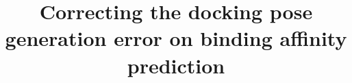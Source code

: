 \documentclass[twocolumn]{bmcart}
\begin{document}
\begin{frontmatter}

\begin{fmbox}


\title{Correcting the docking pose generation error on binding affinity prediction}


\author[
   addressref={aff1},                   %
   email={jackyleehongjian@gmail.com}   %
]{ }
\author[
   addressref={aff1},                   %
   email={ksleung@cse.cuhk.edu.hk}
]{ }
\author[
   addressref={aff1},                   %
   email={mhwong@cse.cuhk.edu.hk}
]{ }
\author[
   addressref={aff2,aff3,aff4,aff5},
   corref={aff2,aff3,aff4,aff5},                      %
   email={E-Mail: pedro.ballester@inserm.fr; Tel.: +33-486-977-265; Fax: +33-486-977-499}
]{ }



\end{fmbox}
\end{frontmatter}
\end{document}
